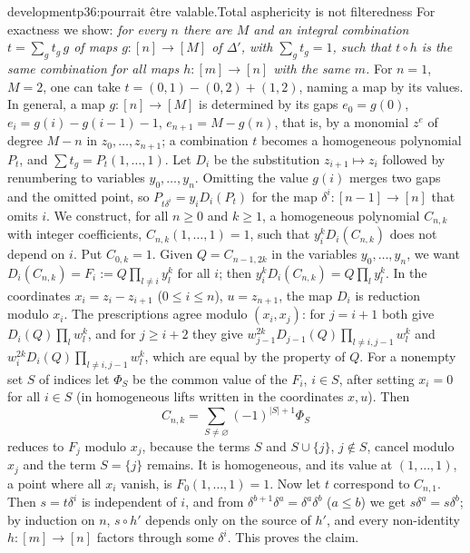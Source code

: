 \begin{dcomment}{development}{p36:pourrait être valable.}{Total asphericity is not filteredness}
For exactness we show: \emph{for every $n$ there are $M$ and an integral combination $t=\sum_gt_g\,g$ of maps $g:[n]\to[M]$ of $\Delta'$, with $\sum_gt_g=1$, such that $t\circ h$ is the same combination for all maps $h:[m]\to[n]$ with the same $m$.} For $n=1$, $M=2$, one can take $t=(0,1)-(0,2)+(1,2)$, naming a map by its values. In general, a map $g:[n]\to[M]$ is determined by its gaps $e_0=g(0)$, $e_i=g(i)-g(i-1)-1$, $e_{n+1}=M-g(n)$, that is, by a monomial $z^e$ of degree $M-n$ in $z_0,\dots,z_{n+1}$; a combination $t$ becomes a homogeneous polynomial $P_t$, and $\sum t_g=P_t(1,\dots,1)$. Let $D_i$ be the substitution $z_{i+1}\mapsto z_i$ followed by renumbering to variables $y_0,\dots,y_n$. Omitting the value $g(i)$ merges two gaps and the omitted point, so $P_{t\delta^i}=y_iD_i(P_t)$ for the map $\delta^i:[n-1]\to[n]$ that omits $i$. We construct, for all $n\geq0$ and $k\geq1$, a homogeneous polynomial $C_{n,k}$ with integer coefficients, $C_{n,k}(1,\dots,1)=1$, such that $y_i^kD_i(C_{n,k})$ does not depend on $i$. Put $C_{0,k}=1$. Given $Q=C_{n-1,2k}$ in the variables $y_0,\dots,y_n$, we want $D_i(C_{n,k})=F_i:=Q\prod_{l\neq i}y_l^k$ for all $i$; then $y_i^kD_i(C_{n,k})=Q\prod_ly_l^k$. In the coordinates $x_i=z_i-z_{i+1}$ ($0\leq i\leq n$), $u=z_{n+1}$, the map $D_i$ is reduction modulo $x_i$. The prescriptions agree modulo $(x_i,x_j)$: for $j=i+1$ both give $D_i(Q)\prod_lw_l^k$, and for $j\geq i+2$ they give $w_{j-1}^{2k}D_{j-1}(Q)\prod_{l\neq i,j-1}w_l^k$ and $w_i^{2k}D_i(Q)\prod_{l\neq i,j-1}w_l^k$, which are equal by the property of $Q$. For a nonempty set $S$ of indices let $\Phi_S$ be the common value of the $F_i$, $i\in S$, after setting $x_i=0$ for all $i\in S$ (in homogeneous lifts written in the coordinates $x,u$). Then
\[
 C_{n,k}=\sum_{S\neq\varnothing}(-1)^{|S|+1}\Phi_S
\]
reduces to $F_j$ modulo $x_j$, because the terms $S$ and $S\cup\{j\}$, $j\notin S$, cancel modulo $x_j$ and the term $S=\{j\}$ remains. It is homogeneous, and its value at $(1,\dots,1)$, a point where all $x_i$ vanish, is $F_0(1,\dots,1)=1$. Now let $t$ correspond to $C_{n,1}$. Then $s=t\delta^i$ is independent of $i$, and from $\delta^{b+1}\delta^a=\delta^a\delta^b$ ($a\leq b$) we get $s\delta^a=s\delta^b$; by induction on $n$, $s\circ h'$ depends only on the source of $h'$, and every non-identity $h:[m]\to[n]$ factors through some $\delta^i$. This proves the claim.


\end{dcomment}
